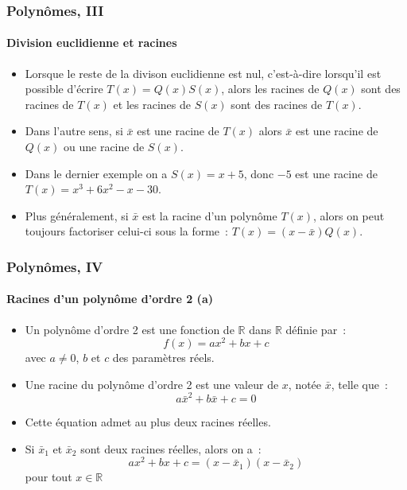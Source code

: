 \documentclass[10pt,notheorems]{beamer}
\theoremstyle{plain}
\theoremstyle{definition} %
\begin{document}
\begin{frame}
  \frametitle{Polynômes, III}
  \framesubtitle{Division euclidienne et racines}
  \hypertarget{slide_division_racine}{}

  \bigskip

  \begin{itemize}

  \item Lorsque le reste de la divison euclidienne est nul, c'est-à-dire lorsqu'il est possible d'écrire $T(x)=Q(x)S(x)$, alors les racines de $Q(x)$ sont des racines de $T(x)$ et les racines de $S(x)$ sont des racines de $T(x)$.\newline

  \item Dans l'autre sens, si $\bar x$ est une racine de $T(x)$ alors $\bar x$ est une racine de $Q(x)$ ou une racine de $S(x)$.\newline

  \item Dans le dernier exemple on a $S(x)=x+5$, donc $-5$ est une racine de $T(x)=x^3+6x^2-x-30$.\newline

  \item Plus généralement, si $\bar x$ est la racine d'un polynôme $T(x)$, alors on peut toujours factoriser celui-ci sous la forme~: $T(x) = (x-\bar x) Q(x)$.
  \end{itemize}

\end{frame}


\begin{frame}
  \frametitle{Polynômes, IV}
  \framesubtitle{Racines d'un polynôme d'ordre 2 (a)}
  \hypertarget{slide_polynome_2_racines_1}{}

  \bigskip

  \begin{itemize}

  \item Un polynôme d'ordre 2 est une fonction de $\mathbb R$ dans $\mathbb R$ définie par~:
    \[
      f(x) = ax^2 + bx + c
    \]
    avec $a\neq 0$, $b$ et $c$ des paramètres réels.\newline

  \item Une racine du polynôme d'ordre 2 est une valeur de $x$, notée $\bar x$, telle que~:
    \[
      a\bar x^2 + b\bar x + c = 0
    \]

    \bigskip

  \item Cette équation admet au plus deux racines réelles.\newline

  \item Si $\bar x_1$ et $\bar x_2$ sont deux racines réelles, alors on a~:
    \[
      a x^2 + b x + c = (x-\bar x_1)(x-\bar x_2)
    \]
    pour tout $x\in\mathbb R$

  \end{itemize}

\end{frame}
\end{document}
